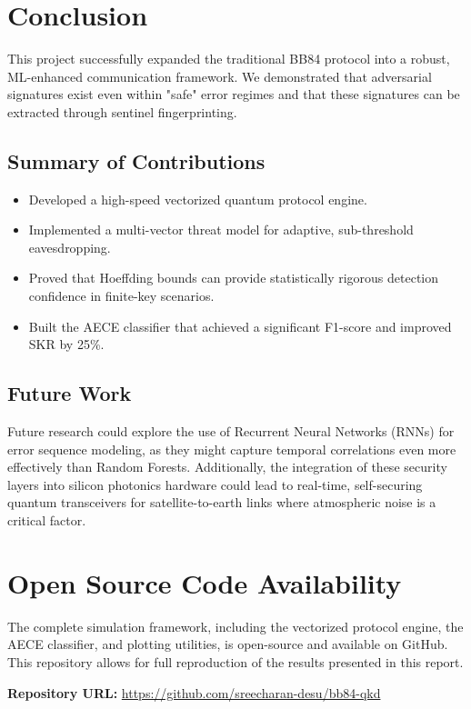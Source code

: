 \documentclass[journal,onecolumn,12pt,draftclsnofoot]{IEEEtran}
\begin{document}
\newpage

\section{Conclusion}

This project successfully expanded the traditional BB84 protocol into a robust, ML-enhanced communication framework. We demonstrated that adversarial signatures exist even within "safe" error regimes and that these signatures can be extracted through sentinel fingerprinting.

\subsection{Summary of Contributions}
\begin{itemize}
    \item Developed a high-speed vectorized quantum protocol engine.
    \item Implemented a multi-vector threat model for adaptive, sub-threshold eavesdropping.
    \item Proved that Hoeffding bounds can provide statistically rigorous detection confidence in finite-key scenarios.
    \item Built the AECE classifier that achieved a significant F1-score and improved SKR by 25\%.
\end{itemize}

\subsection{Future Work}
Future research could explore the use of Recurrent Neural Networks (RNNs) for error sequence modeling, as they might capture temporal correlations even more effectively than Random Forests. Additionally, the integration of these security layers into silicon photonics hardware could lead to real-time, self-securing quantum transceivers for satellite-to-earth links where atmospheric noise is a critical factor.

\newpage

\section*{Open Source Code Availability}
The complete simulation framework, including the vectorized protocol engine, the AECE classifier, and plotting utilities, is open-source and available on GitHub. This repository allows for full reproduction of the results presented in this report.
\begin{center}
    \textbf{Repository URL:} \href{https://github.com/sreecharan-desu/bb84-qkd}{https://github.com/sreecharan-desu/bb84-qkd}
\end{center}
\end{document}

